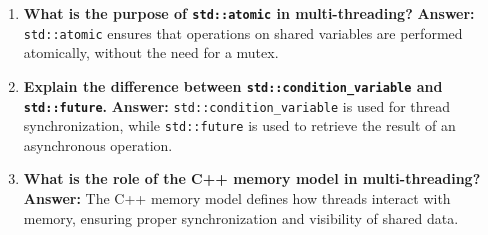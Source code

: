 \documentclass[12pt]{article}
\begin{document}
\begin{enumerate}
    \item \textbf{What is the purpose of \texttt{std::atomic} in multi-threading?}
    \textbf{Answer:} \texttt{std::atomic} ensures that operations on shared variables are performed atomically, without the need for a mutex.

    \item \textbf{Explain the difference between \texttt{std::condition\_variable} and \texttt{std::future}.}
    \textbf{Answer:} \texttt{std::condition\_variable} is used for thread synchronization, while \texttt{std::future} is used to retrieve the result of an asynchronous operation.

    \item \textbf{What is the role of the C++ memory model in multi-threading?}
    \textbf{Answer:} The C++ memory model defines how threads interact with memory, ensuring proper synchronization and visibility of shared data.
\end{enumerate}
\end{document}

